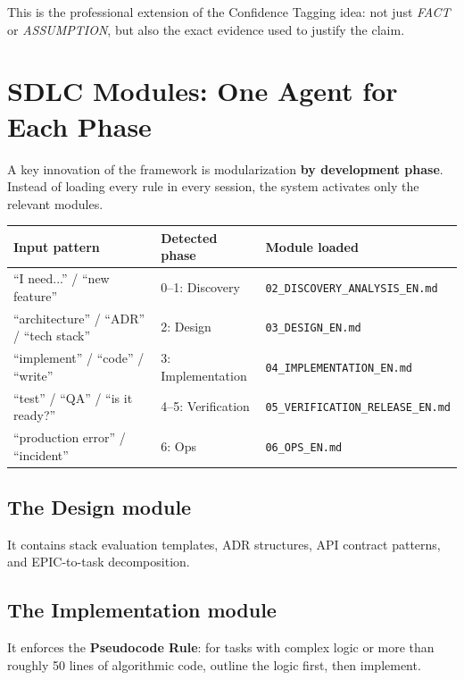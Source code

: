 \begin{notebox}
This is the professional extension of the Confidence Tagging idea: not just \emph{FACT} or \emph{ASSUMPTION}, but also the exact evidence used to justify the claim.
\end{notebox}

\section{SDLC Modules: One Agent for Each Phase}

A key innovation of the framework is modularization \textbf{by development phase}. Instead of loading every rule in every session, the system activates only the relevant modules.

\begin{center}
\begin{small}
\begin{tabularx}{\textwidth}{X l X}
\toprule
\textbf{Input pattern} & \textbf{Detected phase} & \textbf{Module loaded} \\
\midrule
``I need...'' / ``new feature'' & 0--1: Discovery & \texttt{02\_DISCOVERY\_ANALYSIS\_EN.md} \\
``architecture'' / ``ADR'' / ``tech stack'' & 2: Design & \texttt{03\_DESIGN\_EN.md} \\
``implement'' / ``code'' / ``write'' & 3: Implementation & \texttt{04\_IMPLEMENTATION\_EN.md} \\
``test'' / ``QA'' / ``is it ready?'' & 4--5: Verification & \texttt{05\_VERIFICATION\_RELEASE\_EN.md} \\
``production error'' / ``incident'' & 6: Ops & \texttt{06\_OPS\_EN.md} \\
\bottomrule
\end{tabularx}
\end{small}
\end{center}

\subsection{The Design module}
It contains stack evaluation templates, ADR structures, API contract patterns, and EPIC-to-task decomposition.

\subsection{The Implementation module}
It enforces the \textbf{Pseudocode Rule}: for tasks with complex logic or more than roughly 50 lines of algorithmic code, outline the logic first, then implement.

